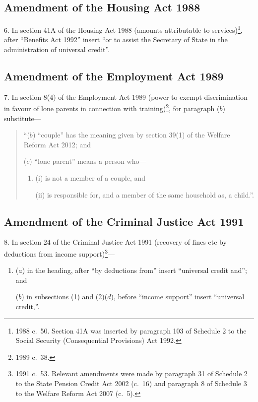 \documentclass[12pt,a4paper]{article}
\begin{document}
\subsection[6. Amendment of the Housing Act 1988]{Amendment of the Housing Act 1988}

6.  In section 41A of the Housing Act 1988 (amounts attributable to services)\footnote{1988 c.~50. Section 41A was inserted by paragraph 103 of Schedule 2 to the Social Security (Consequential Provisions) Act 1992.}, after “Benefits Act 1992” insert “or to assist the Secretary of State in the administration of universal credit”.

\subsection[7. Amendment of the Employment Act 1989]{Amendment of the Employment Act 1989}

7.  In section 8(4) of the Employment Act 1989 (power to exempt discrimination in favour of lone parents in connection with training)\footnote{1989 c.~38.}, for paragraph ($b$)  substitute—
\begin{quotation}
“($b$) “couple” has the meaning given by section 39(1) of the Welfare Reform Act 2012; and

($c$) “lone parent” means a person who—
\begin{enumerate}\item[]
(i) is not a member of a couple, and

(ii) is responsible for, and a member of the same household as, a child.”.
\end{enumerate}
\end{quotation}

\subsection[8. Amendment of the Criminal Justice Act 1991]{Amendment of the Criminal Justice Act 1991}

8.  In section 24 of the Criminal Justice Act 1991 (recovery of fines etc by deductions from income support)\footnote{1991 c.~53. Relevant amendments were made by paragraph 31 of Schedule 2 to the State Pension Credit Act 2002 (c.~16) and paragraph 8 of Schedule 3 to the Welfare Reform Act 2007 (c.~5).}—
\begin{enumerate}\item[]
($a$) in the heading, after “by deductions from” insert “universal credit and”; and

($b$) in subsections (1) and (2)($d$), before “income support” insert “universal credit,”.
\end{enumerate}
\end{document}

